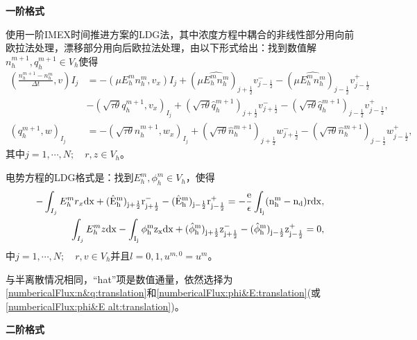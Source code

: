 \noindent \textbf{一阶格式}

使用一阶IMEX时间推进方案的LDG法，其中浓度方程中耦合的非线性部分用向前欧拉法处理，漂移部分用向后欧拉法处理，由以下形式给出：找到数值解$n_h^{m+1},q_h^{m+1}\in V_h$使得
\begin{align}
    (\frac{n_h^{m+1} - n_h^m}{\Delta t},v)I_j & = -(\mu E_h^mn_h^m, v_x)I_j + (\mu \hat{E_h^mn_h^m})_{j+\frac{1}{2}}v_{j-\frac{1}{2}}^- - (\mu\hat{E_h^mn_h^m})_{j-\frac{1}{2}}v^+_{j-\frac{1}{2}}                                         \nonumber                                  \\
                                              & -(\sqrt{\tau \theta}q_h^{m+1},v_x)_{I_j} + (\sqrt{\tau \theta}\hat{q}_h^{m+1})_{j+\frac{1}{2}}v_{j+\frac{1}{2}}^- - (\sqrt{\tau \theta}\hat{q}_h^{m+1})_{j-\frac{1}{2}}v_{j-\frac{1}{2}}^+,  \label{weakForm:IMEX1 LDG 1:translation} \\
    (q_h^{m+1},w)_{I_j}                       & = -(\sqrt{\tau \theta}n_h^{m+1},w_x)_{I_j} + (\sqrt{\tau \theta}\hat{n}_h^{m+1})_{j+\frac{1}{2}}w_{j+\frac{1}{2}}^- - (\sqrt{\tau \theta}\hat{n}_h^{m+1})_{j-\frac{1}{2}}w_{j-\frac{1}{2}}^+,\label{weakForm:IMEX1 LDG 2:translation}
\end{align}
其中$j = 1,\cdots,N;\quad r,z \in V_h$。

电势方程的LDG格式是：找到$E_h^{m},\phi_h^{m} \in V_h$，使得
\begin{align}
    -\int_{I_j} E_h^{m}r_x \rm{d}x + (\hat{E}_h^{m})_{j+\frac{1}{2}}r_{j+\frac{1}{2}}^- - (\hat{E}_h^{m})_{j-\frac{1}{2}}r_{j-\frac{1}{2}}^+ = -\frac{e}{\epsilon}\int_{I_j}(n_h^{m} - n_d) r\rm{d} x, \label{equation:IMEX1 LDG:EPE 1:translation} \\
    \int_{I_j} E_h^{m}z \rm{d}x - \int_{I_j} \phi_h^{m}z_x \rm{d}x  + (\hat{\phi}_h^{m})_{j+\frac{1}{2}}z^-_{j+\frac{1}{2}} - (\hat{\phi}_h^{m})_{j-\frac{1}{2}}z_{j-\frac{1}{2}}^+  = 0,\label{equation:IMEX1 LDG:EPE 2:translation}
\end{align}
中$j = 1,\cdots,N;\quad r,v \in V_h$并且$l = 0,1, u^{m,0} = u^m$。

与半离散情况相同，“hat”项是数值通量，依然选择为\eqref{numbericalFlux:n&q:translation}和\eqref{numbericalFlux:phi&E:translation}(或\eqref{numbericalFlux:phi&E alt:translation})。

\noindent \textbf{二阶格式}

